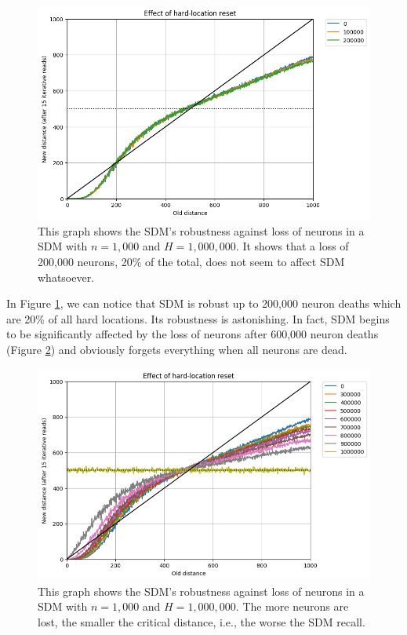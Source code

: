\begin{figure}[!p]
\centering\includegraphics[width=\textwidth]{./images02/new-images/sdm-neuron-death-200k.png}
\caption{This graph shows the SDM's robustness against loss of neurons in a SDM with $n=1,000$ and $H=1,000,000$. It shows that a loss of 200,000 neurons, 20\% of the total, does not seem to affect SDM whatsoever.
\label{fig:sdm-neuron-death-200k}}
\end{figure}

In Figure \ref{fig:sdm-neuron-death-200k}, we can notice that SDM is robust up to 200,000 neuron deaths which are 20\% of all hard locations. Its robustness is astonishing.  In fact, SDM begins to be significantly affected by the loss of neurons after 600,000 neuron deaths (Figure \ref{fig:sdm-neuron-death-1m}) and obviously forgets everything when all neurons are dead.

\begin{figure}[!p]
\centering\includegraphics[width=\textwidth]{./images02/new-images/sdm-neuron-death-1m.png}
\caption{This graph shows the SDM's robustness against loss of neurons in a SDM with $n=1,000$ and $H=1,000,000$. The more neurons are lost, the smaller the critical distance, i.e., the worse the SDM recall.
\label{fig:sdm-neuron-death-1m}}
\end{figure}

